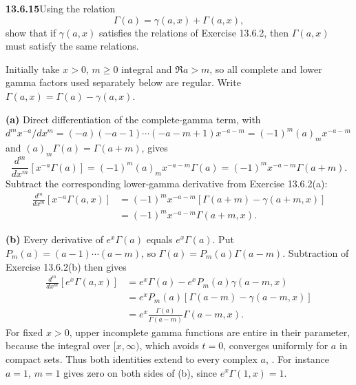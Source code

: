 \par\bigskip
\noindent\textbf{13.6.15}\quad Using the relation
\[
\Gamma(a)=\gamma(a,x)+\Gamma(a,x),
\]
show that if $\gamma(a,x)$ satisfies the relations of Exercise 13.6.2, then
$\Gamma(a,x)$ must satisfy the same relations.
\par\smallskip
{}
\solution
Initially take $x>0$, $m\ge0$ integral and $\Re a>m$, so all
complete and lower gamma factors used separately below are
regular.  Write $\Gamma(a,x)=\Gamma(a)-\gamma(a,x)$.

\textbf{(a)} Direct differentiation of the complete-gamma term,
with $d^mx^{-a}/dx^m=(-a)(-a-1)\cdots(-a-m+1)x^{-a-m}
=(-1)^m(a)_mx^{-a-m}$ and $(a)_m\Gamma(a)=\Gamma(a+m)$, gives
\[
\frac{d^m}{dx^m}[x^{-a}\Gamma(a)]
=(-1)^m(a)_m x^{-a-m}\Gamma(a)
=(-1)^mx^{-a-m}\Gamma(a+m).
\]
Subtract the corresponding lower-gamma derivative from
Exercise 13.6.2(a):
\begin{align*}
\frac{d^m}{dx^m}[x^{-a}\Gamma(a,x)]
&=(-1)^mx^{-a-m}[\Gamma(a+m)-\gamma(a+m,x)]\\
&=\boxed{(-1)^mx^{-a-m}\Gamma(a+m,x)}.
\end{align*}

\textbf{(b)} Every derivative of $e^x\Gamma(a)$ equals
$e^x\Gamma(a)$.  Put $P_m(a)=(a-1)\cdots(a-m)$,
so $\Gamma(a)=P_m(a)\Gamma(a-m)$.  Subtraction of
Exercise 13.6.2(b) then gives
\begin{align*}
\frac{d^m}{dx^m}[e^x\Gamma(a,x)]
&=e^x\Gamma(a)-e^xP_m(a)\gamma(a-m,x)\\
&=e^xP_m(a)[\Gamma(a-m)-\gamma(a-m,x)]\\
&=\boxed{e^x\frac{\Gamma(a)}{\Gamma(a-m)}\Gamma(a-m,x)}.
\end{align*}
For fixed $x>0$, upper incomplete gamma functions are entire
in their parameter, because the integral over $[x,\infty)$,
which avoids $t=0$, converges uniformly for $a$ in compact sets.
Thus both identities extend to every
complex $a$, .
For instance $a=1$, $m=1$ gives zero on both sides of (b),
since $e^x\Gamma(1,x)=1$.


